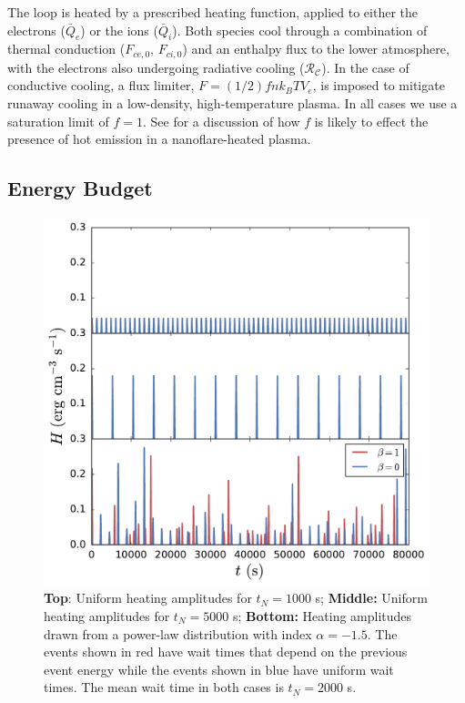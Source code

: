 \documentclass[apj]{emulateapj}
\begin{document}
	\par The loop is heated by a prescribed heating function, applied to either the electrons ($\bar{Q}_e$) or the ions ($\bar{Q}_i$). Both species cool through a combination of thermal conduction ($F_{ce,0},\,F_{ci,0}$) and an enthalpy flux to the lower atmosphere, with the electrons also undergoing radiative cooling ($\mathcal{R_C}$). In the case of conductive cooling, a flux limiter, $F=(1/2)fnk_BTV_e$, is imposed to mitigate runaway cooling in a low-density, high-temperature plasma. In all cases we use a saturation limit of $f=1$. See  for a discussion of how $f$ is likely to effect the presence of hot emission in a nanoflare-heated plasma.
	\subsection{Energy Budget}
	\label{subsec:params}
	\begin{figure}
		\centering
		\includegraphics[width=\columnwidth]{figures/heating_functions.pdf}
		\caption{\textbf{Top}: Uniform heating amplitudes for $t_N=1000$ s; \textbf{Middle:} Uniform heating amplitudes for $t_N=5000$ s; \textbf{Bottom:} Heating amplitudes drawn from a power-law distribution with index $\alpha=-1.5$. The events shown in red have wait times that depend on the previous event energy while the events shown in blue have uniform wait times. The mean wait time in both cases is $t_N=2000$ s.}
		\label{fig:heating_funcs}
	\end{figure}
\end{document}
